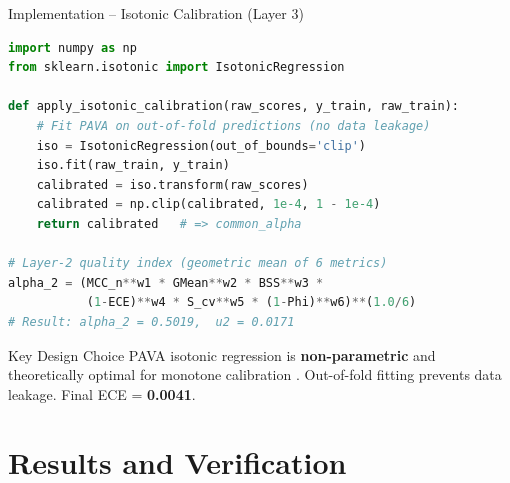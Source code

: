 \documentclass[aspectratio=169]{beamer}
\begin{document}
\begin{frame}[fragile]{Implementation -- Isotonic Calibration (Layer 3)}
  \begin{lstlisting}[language=Python,
      caption={Isotonic calibration applied after Dempster-Shafer fusion}]
import numpy as np
from sklearn.isotonic import IsotonicRegression

def apply_isotonic_calibration(raw_scores, y_train, raw_train):
    # Fit PAVA on out-of-fold predictions (no data leakage)
    iso = IsotonicRegression(out_of_bounds='clip')
    iso.fit(raw_train, y_train)
    calibrated = iso.transform(raw_scores)
    calibrated = np.clip(calibrated, 1e-4, 1 - 1e-4)
    return calibrated   # => common_alpha

# Layer-2 quality index (geometric mean of 6 metrics)
alpha_2 = (MCC_n**w1 * GMean**w2 * BSS**w3 *
           (1-ECE)**w4 * S_cv**w5 * (1-Phi)**w6)**(1.0/6)
# Result: alpha_2 = 0.5019,  u2 = 0.0171
  \end{lstlisting}
  \begin{block}{Key Design Choice}
    PAVA isotonic regression is \textbf{non-parametric} and theoretically
    optimal for monotone calibration \cite{zadrozny2002}. Out-of-fold fitting
    prevents data leakage. Final ECE = \textbf{0.0041}.
  \end{block}
\end{frame}

\section{Results and Verification}
\end{document}
